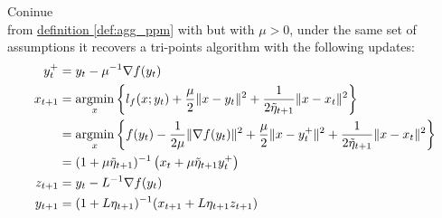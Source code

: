 \documentclass[12pt]{article}
\begin{document}
            \begin{proposition}\label{prop:tri_scvx_from_ahn_sra_6.24}
                Coninue \\ 
                from \hyperref[def:agg_ppm]{definition \ref*{def:agg_ppm}} with but with $\mu > 0$, under the same set of assumptions it recovers a tri-points algorithm with the following updates: 
                \begin{align*}
                    y_t^+ &= y_t - \mu^{-1}\nabla f(y_t)
                    \\
                    x_{t + 1} &= \mathop{\rm argmin}\limits_{x} 
                    \left\lbrace
                        l_f (x; y_t) + \frac{\mu}{2} \Vert x - y_t\Vert^2 + 
                        \frac{1}{2\tilde \eta_{t + 1}} \Vert x - x_t\Vert^2 
                    \right\rbrace
                    \\
                    &= \mathop{\rm argmin}\limits_{x}
                    \left\lbrace
                        f(y_t) - \frac{1}{2\mu} \Vert \nabla f(y_t)\Vert^2 
                        + 
                        \frac{\mu
                        }{2}\Vert x - y_t^+\Vert^2
                        + 
                        \frac{1}{2\tilde \eta_{t + 1}}\Vert x - x_t\Vert^2
                    \right\rbrace
                    \\
                    &= (1 + \mu\tilde \eta_{t + 1})^{-1}
                    \left(
                        x_t + \mu \tilde \eta_{t + 1}y_t^{+}
                    \right)
                    \\
                    z_{t + 1} &= y_t - L^{-1} \nabla f(y_t)
                    \\
                    y_{t + 1} &= (1 + L\eta_{t + 1})^{-1}(x_{t + 1} + L \eta_{t + 1} z_{t + 1})
                \end{align*}
            \end{proposition}
\end{document}
